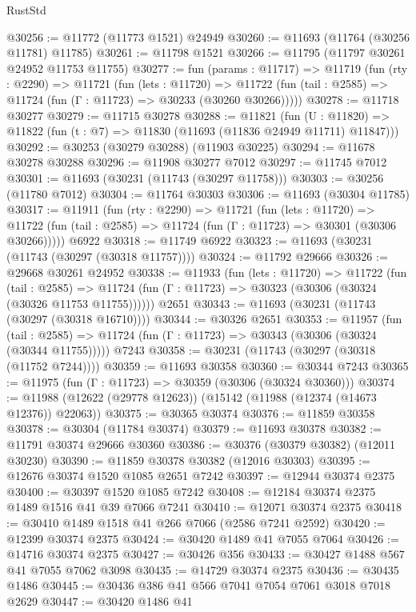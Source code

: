 \begin{lexlean}{RustStd}
\begin{coremodule}
@30256 := @11772 (@11773 @1521) @24949
@30260 := @11693 (@11764 (@30256 @11781) @11785)
@30261 := @11798 @1521
@30266 := @11795 (@11797 @30261 @24952 @11753 @11755)
@30277 := fun (params : @11717) =>
  @11719
    (fun (rty : @2290) =>
    @11721
      (fun (lets : @11720) =>
      @11722 (fun (tail : @2585) => @11724 (fun (Γ : @11723) => @30233 (@30260 @30266)))))
@30278 := @11718 @30277
@30279 := @11715 @30278
@30288 := @11821
    (fun (U : @11820) => @11822 (fun (t : @7) => @11830 (@11693 (@11836 @24949 @11711) @11847)))
@30292 := @30253 (@30279 @30288) (@11903 @30225)
@30294 := @11678 @30278 @30288
@30296 := @11908 @30277 @7012
@30297 := @11745 @7012
@30301 := @11693 (@30231 (@11743 (@30297 @11758)))
@30303 := @30256 (@11780 @7012)
@30304 := @11764 @30303
@30306 := @11693 (@30304 @11785)
@30317 := @11911
    (fun (rty : @2290) =>
    @11721
      (fun (lets : @11720) =>
      @11722 (fun (tail : @2585) => @11724 (fun (Γ : @11723) => @30301 (@30306 @30266)))))
    @6922
@30318 := @11749 @6922
@30323 := @11693 (@30231 (@11743 (@30297 (@30318 @11757))))
@30324 := @11792 @29666
@30326 := @29668 @30261 @24952
@30338 := @11933
    (fun (lets : @11720) =>
    @11722
      (fun (tail : @2585) =>
      @11724 (fun (Γ : @11723) => @30323 (@30306 (@30324 (@30326 @11753 @11755))))))
    @2651
@30343 := @11693 (@30231 (@11743 (@30297 (@30318 @16710))))
@30344 := @30326 @2651
@30353 := @11957
    (fun (tail : @2585) => @11724 (fun (Γ : @11723) => @30343 (@30306 (@30324 (@30344 @11755)))))
    @7243
@30358 := @30231 (@11743 (@30297 (@30318 (@11752 @7244))))
@30359 := @11693 @30358
@30360 := @30344 @7243
@30365 := @11975 (fun (Γ : @11723) => @30359 (@30306 (@30324 @30360)))
@30374 := @11988 (@12622 (@29778 @12623)) (@15142 (@11988 (@12374 (@14673 @12376)) @22063))
@30375 := @30365 @30374
@30376 := @11859 @30358
@30378 := @30304 (@11784 @30374)
@30379 := @11693 @30378
@30382 := @11791 @30374 @29666 @30360
@30386 := @30376 (@30379 @30382) (@12011 @30230)
@30390 := @11859 @30378 @30382 (@12016 @30303)
@30395 := @12676 @30374 @1520 @1085 @2651 @7242
@30397 := @12944 @30374 @2375
@30400 := @30397 @1520 @1085 @7242
@30408 := @12184 @30374 @2375 @1489 @1516 @41 @39 @7066 @7241
@30410 := @12071 @30374 @2375
@30418 := @30410 @1489 @1518 @41 @266 @7066 (@2586 @7241 @2592)
@30420 := @12399 @30374 @2375
@30424 := @30420 @1489 @41 @7055 @7064
@30426 := @14716 @30374 @2375
@30427 := @30426 @356
@30433 := @30427 @1488 @567 @41 @7055 @7062 @3098
@30435 := @14729 @30374 @2375
@30436 := @30435 @1486
@30445 := @30436 @386 @41 @566 @7041 @7054 @7061 @3018 @7018 @2629
@30447 := @30420 @1486 @41

\end{coremodule}
\end{lexlean}
